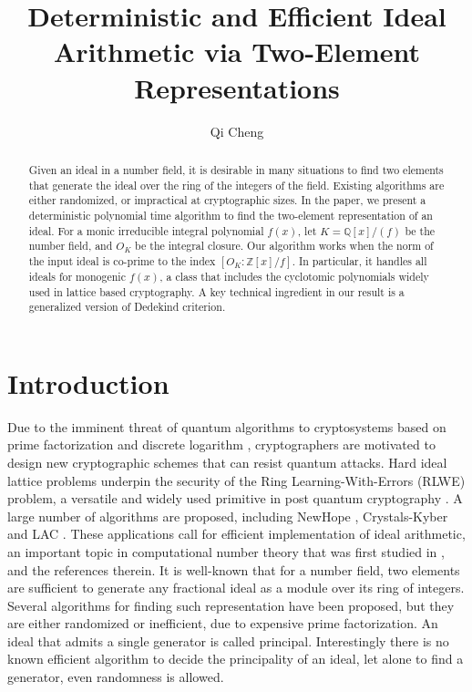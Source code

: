 \documentclass[runningheads, letter]{llncs}
\newcommand{\Z}{{\mathbb Z}}
\newcommand{\Q}{{\mathbb Q}}
\begin{document}
\mainmatter
\title
{Deterministic and Efficient Ideal Arithmetic via
  Two-Element Representations}
%
%

\author{Qi Cheng %
 }
\maketitle

\begin{abstract}
  Given an ideal in a number field, it is desirable in many situations
  to find two elements that generate the ideal over the ring of the
  integers of the field.  Existing algorithms are either randomized,
  or impractical at cryptographic sizes.
  In the paper, we present a deterministic
  polynomial time algorithm to find the two-element representation of
  an ideal.  For a monic irreducible integral polynomial \( f(x) \),
  let \( K=\Q[x]/(f) \) be the number field, and
  \( O_K \) be the integral closure. Our algorithm works when
  the norm of the input ideal is co-prime to the index
  \( [O_K:\Z[x]/f] \). In particular, it
  handles all ideals for monogenic \( f(x) \),
  a class that includes the cyclotomic polynomials widely used in
  lattice based cryptography.  A key technical ingredient in our
  result is a generalized version of Dedekind criterion.
\end{abstract}

\section{Introduction}

Due to the imminent threat of quantum algorithms to
cryptosystems based on prime factorization and discrete logarithm
\cite{Shor94}, cryptographers are motivated
to design new cryptographic schemes that can resist quantum attacks.
Hard ideal lattice problems underpin the security of the Ring
Learning-With-Errors (RLWE) problem, a versatile and widely used
primitive in post quantum cryptography \cite{HPS98,LPR10,SSTX09}.
A large number of algorithms are proposed, including NewHope
\cite{NewHope}, Crystals-Kyber \cite{Kyber} and LAC \cite{LAC}.
%
%
These applications call for efficient implementation of
ideal arithmetic, an important topic in computational number
theory that was first studied in \cite{Cohen93,Cohen2012},
and the references therein.
%
%
It is well-known that for a number field,
two elements are sufficient to generate any fractional ideal as a
module over its ring of integers.  Several algorithms
for finding such representation have been proposed,
but they are either randomized or inefficient,
due to expensive prime factorization.
An ideal that admits a single generator is called principal. 
Interestingly there is no known efficient algorithm
to decide the principality of an ideal, let alone to find a
generator, even randomness is allowed.
\end{document}
